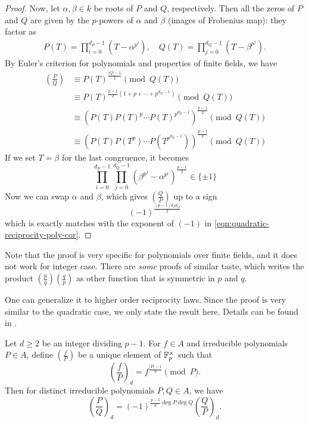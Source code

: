 \begin{proof}
    Now, let $\alpha, \beta \in k$ be roots of $P$ and $Q$, respectively.
    Then all the zeros of $P$ and $Q$ are given by the $p$-powers of $\alpha$ and $\beta$ (images of Frobenius map): they factor as
    \begin{align*}
        P(T) = \prod_{i = 0}^{d_P - 1} (T - \alpha^{p^i}), \quad Q(T) = \prod_{j = 0}^{d_Q - 1} (T - \beta^{p^j}).
    \end{align*}
    By Euler's criterion for polynomials and properties of finite fields, we have
    \begin{align*}
        \left(\frac{P}{Q}\right) &\equiv P(T)^{\frac{|Q| - 1}{2}} \pmod{Q(T)} \\
        &\equiv P(T)^{\frac{p - 1}{2}(1 + p + \cdots + p^{d_Q - 1})} \pmod{Q(T)} \\
        &\equiv (P(T)P(T)^p \cdots P(T)^{p^{d_Q - 1}})^{\frac{p-1}{2}} \pmod{Q(T)} \\
        &\equiv (P(T) P(T^p) \cdots P(T^{p^{d_Q - 1}}))^{\frac{p-1}{2}} \pmod{Q(T)}
    \end{align*}
    If we set $T = \beta$ for the last congruence, it becomes
    \[
    \prod_{i=0}^{d_P - 1} \prod_{j=0}^{d_Q - 1} (\beta^{p^j} - \alpha^{p^i})^{\frac{p-1}{2}} \in \{\pm 1\}
    \]
    Now we can swap $\alpha$ and $\beta$, which gives $\left(\frac{Q}{P}\right)$ up to a sign
    \[
    (-1)^{\frac{(p-1) d_P d_Q}{2}}
    \]
    which is exactly matches with the exponent of $(-1)$ in \eqref{eqn:quadratic-reciprocity-poly-cor}.
\end{proof}
Note that the proof is very specific for polynomials over finite fields, and it does not work for integer case.
There are \emph{some} proofs of similar taste, which writes the product $\left(\frac{p}{q}\right)\left(\frac{q}{p}\right)$ as other function that is symmetric in $p$ and $q$.

One can generalize it to higher order reciprocity laws.
Since the proof is very similar to the quadratic case, we only state the result here.
Details can be found in \cite[Chapter 3]{rosen2013number}.
\begin{theorem}
    Let $d \ge 2$ be an integer dividing $p - 1$.
    For $f \in A$ and irreducible polynomials $P \in A$, define $\left(\frac{f}{P}\right)$ be a unique element of $\mathbb{F}_p^\times$ such that
    \begin{equation}
        \left(\frac{f}{P}\right)_d = f^{\frac{|P| - 1}{d}} \pmod{P}.
        \label{eqn:legendre-symbol-poly-d}
    \end{equation}
    Then for distinct irreducible polynomials $P, Q \in A$, we have
    \begin{equation}
        \left(\frac{P}{Q}\right)_d  = (-1)^{\frac{p - 1}{d} \deg P \deg Q} \left(\frac{Q}{P}\right)_d.
        \label{eqn:dth-power-reciprocity-poly}
    \end{equation}
\end{theorem}

